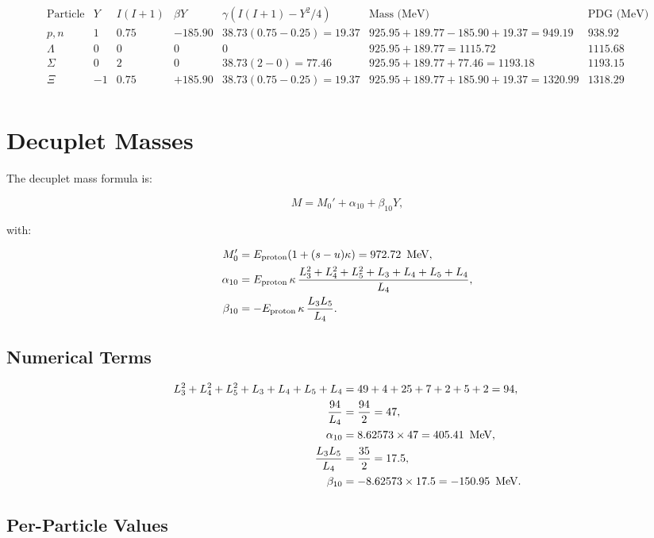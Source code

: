 \[
\begin{array}{ccccccc}
\text{Particle} & Y & I(I{+}1) & \beta Y & \gamma(I(I{+}1){-}Y^2/4) & \text{Mass (MeV)} & \text{PDG (MeV)} \\
\hline
p,n & 1 & 0.75 & -185.90 & 38.73(0.75{-}0.25) = 19.37 & 925.95{+}189.77{-}185.90{+}19.37 = 949.19 & 938.92 \\
\Lambda & 0 & 0 & 0 & 0 & 925.95{+}189.77 = 1115.72 & 1115.68 \\
\Sigma & 0 & 2 & 0 & 38.73(2{-}0) = 77.46 & 925.95{+}189.77{+}77.46 = 1193.18 & 1193.15 \\
\Xi & -1 & 0.75 & +185.90 & 38.73(0.75{-}0.25) = 19.37 & 925.95{+}189.77{+}185.90{+}19.37 = 1320.99 & 1318.29 \\
\end{array}
\]

\section{Decuplet Masses}

The decuplet mass formula is:

\[
M = M_0' + \alpha_{10} + \beta_{10} Y,
\]

with:

\[
\begin{aligned}
M_0'    &= E_{\text{proton}}(1 + (s-u)\kappa) = 972.72\ \,\text{MeV}, \\
\alpha_{10} &= E_{\text{proton}}\,\kappa\,\frac{L_3^2 + L_4^2 + L_5^2 + L_3 + L_4 + L_5 + L_4}{L_4}, \\
\beta_{10} &= -E_{\text{proton}}\,\kappa\,\frac{L_3 L_5}{L_4}.
\end{aligned}
\]

\subsection{Numerical Terms}

\[
\begin{aligned}
L_3^2 + L_4^2 + L_5^2 + L_3 + L_4 + L_5 + L_4 &= 49 + 4 + 25 + 7 + 2 + 5 + 2 = 94, \\
\frac{94}{L_4} &= \frac{94}{2} = 47, \\
\alpha_{10} &= 8.62573 \times 47 = 405.41\ \,\text{MeV}, \\
\frac{L_3 L_5}{L_4} &= \frac{35}{2} = 17.5, \\
\beta_{10} &= -8.62573 \times 17.5 = -150.95\ \,\text{MeV}.
\end{aligned}
\]

\subsection{Per-Particle Values}

